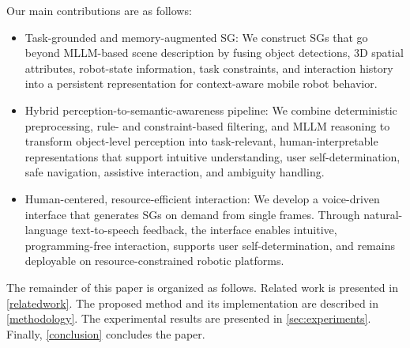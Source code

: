\documentclass[lettersize,journal]{IEEEtran}
\begin{document}

Our main contributions are as follows:


\begin{itemize}
	\item Task-grounded and memory-augmented SG: 
	We construct SGs that go beyond MLLM-based scene description by fusing object detections, 3D spatial attributes, robot-state information, task constraints, and interaction history into a persistent representation for context-aware mobile robot behavior.
	
	\item Hybrid perception-to-semantic-awareness pipeline: 
	We combine deterministic preprocessing, rule- and constraint-based filtering, and MLLM reasoning to transform object-level perception into task-relevant, human-interpretable representations that support intuitive understanding, user self-determination, safe navigation, assistive interaction, and ambiguity handling.
	
   \item Human-centered, resource-efficient interaction:
We develop a voice-driven interface that generates SGs on demand from single frames. Through natural-language text-to-speech feedback, the interface enables intuitive, programming-free interaction, supports user self-determination, and remains deployable on resource-constrained robotic platforms.
\end{itemize}

The remainder of this paper is organized as follows. Related work is presented in \cref{relatedwork}. The proposed method and its implementation are described in \cref{methodology}. The experimental results are presented in \cref{sec:experiments}. Finally, \cref{conclusion} concludes the paper.
\end{document}
